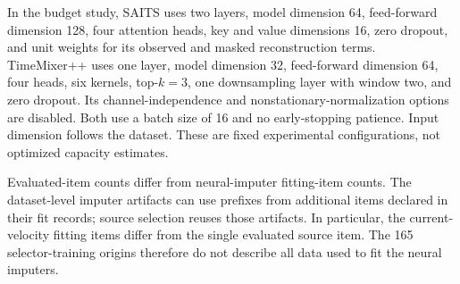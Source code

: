 \documentclass{article}
\begin{document}
In the budget study, SAITS uses two layers, model dimension 64, feed-forward dimension 128, four attention heads, key and value dimensions 16, zero dropout, and unit weights for its observed and masked reconstruction terms. TimeMixer++ uses one layer, model dimension 32, feed-forward dimension 64, four heads, six kernels, top-$k=3$, one downsampling layer with window two, and zero dropout. Its channel-independence and nonstationary-normalization options are disabled. Both use a batch size of 16 and no early-stopping patience. Input dimension follows the dataset. These are fixed experimental configurations, not optimized capacity estimates.

Evaluated-item counts differ from neural-imputer fitting-item counts. The dataset-level imputer artifacts can use prefixes from additional items declared in their fit records; source selection reuses those artifacts. In particular, the current-velocity fitting items differ from the single evaluated source item. The 165 selector-training origins therefore do not describe all data used to fit the neural imputers.
\end{document}
